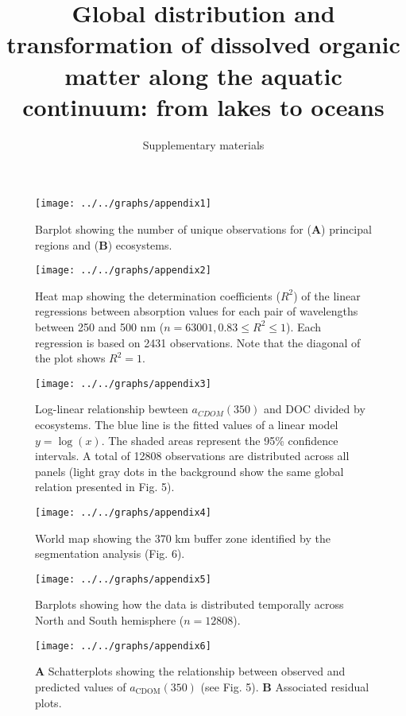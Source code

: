 \documentclass[12pt,a4paper]{scrartcl}
\title{Global distribution and transformation of dissolved organic matter along the aquatic continuum: from lakes to oceans}
\subtitle{Supplementary materials}
\date{}
\begin{document}
\maketitle

\begin{figure}[h]
	\centering
	\texttt{[image: ../../graphs/appendix1]}
	\caption{Barplot showing the number of unique observations for (\textbf{A}) principal regions and (\textbf{B}) ecosystems.}
\end{figure}

\clearpage
\newpage



\clearpage
\newpage

\begin{figure}[h]
	\centering
	\texttt{[image: ../../graphs/appendix2]}
	\caption{Heat map showing the determination coefficients ($R^2$) of the linear regressions between absorption values for each pair of wavelengths between 250 and 500 nm ($n = 63001, 0.83 \le R^2 \le 1$). Each regression is based on 2431 observations. Note that the diagonal of the plot shows $R^2 = 1$. }
\end{figure}

\clearpage
\newpage

\begin{figure}[h]
	\centering
	\texttt{[image: ../../graphs/appendix3]}

	\caption{Log-linear relationship bewteen $a_{CDOM}(350)$ and DOC divided by ecosystems. The blue line is the fitted values of a linear model $y = \log(x)$. The shaded areas represent the 95\% confidence intervals. A total of 12808 observations are distributed across all panels (light gray dots in the background show the same global relation presented in Fig. 5).}
\end{figure}

\clearpage
\newpage

\begin{figure}[h]
	\centering
	\texttt{[image: ../../graphs/appendix4]}
	\caption{World map showing the 370 km buffer zone identified by the segmentation analysis (Fig. 6).}
\end{figure}

\clearpage
\newpage

\begin{figure}[h]
	\centering
	\texttt{[image: ../../graphs/appendix5]}
	\caption{Barplots showing how the data is distributed temporally across North and South hemisphere ($n = 12808$).}
\end{figure}


\clearpage
\newpage

\begin{figure}[h]
	\centering
	\texttt{[image: ../../graphs/appendix6]}
	\caption{\textbf{A} Schatterplots showing the relationship between observed and predicted values of $a_{\text{CDOM}}(350)$ (see Fig. 5). \textbf{B} Associated residual plots.}
\end{figure}
\end{document}
